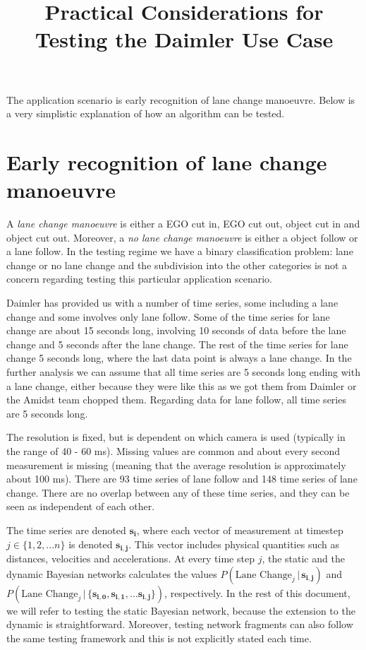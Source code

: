 \documentclass{article}
\title{Practical Considerations for Testing the Daimler Use Case}
\date{}
\theoremstyle{theorem}
\theoremstyle{definition}
\newcommand{\bu}[1]{\mathbf{#1}}
\newcommand{\bv}[1]{\bm{#1}}
\begin{document}
\maketitle

The application scenario is early recognition of lane change manoeuvre.  Below is a very simplistic explanation of how an algorithm can be tested. 

\section{Early recognition of lane change manoeuvre}

A \emph{lane change manoeuvre} is either a EGO cut in, EGO cut out, object cut in and object cut out. Moreover, a \emph{no lane change manoeuvre} is either a object follow or a lane follow.  In the testing regime we have a binary classification problem: lane change or no lane change and the subdivision into the other categories is not a concern regarding testing this particular application scenario.

Daimler has provided us with a number of time series, some including a lane change and some involves only lane follow. Some of the time series for lane change are about 15 seconds long, involving 10 seconds of data before the lane change and 5 seconds after the lane change. The rest of the time series for lane change 5 seconds long, where the last data point is always a lane change. In the further analysis we can assume that all time series are 5 seconds long ending with a lane change, either because they were like this as we got them from Daimler or the Amidst team chopped them. Regarding data  for lane follow, all time series are 5 seconds long.

The resolution is fixed, but is dependent on which camera is used (typically in the range of 40 - 60 ms).  Missing values are common and about every second measurement is missing (meaning that the average resolution is approximately about 100 ms).  There are 93 time series of lane follow and 148 time series of lane change.  There are no overlap between any of these time series, and they can be seen as independent of each other.

The time series are denoted $\bu{s_i}$, where each vector of measurement at timestep $j \in \{1,2, ... n\}$ is denoted $\bv{s_{i,j}}$. This vector includes physical quantities such as distances, velocities and accelerations.  At every time step $j$, the static and the dynamic Bayesian networks calculates the values  $P(\mbox{Lane Change}_j \,|\,  \bv{s_{i,j}})$ and \\
$P(\mbox{Lane Change}_j \,|\, \{ \bv{s_{i,0}}, \bv{s_{i,1}}, ... \bv{s_{i,j}} \})$, respectively.  In the rest of this document, we will refer to testing the static Bayesian network, because the extension to the dynamic is straightforward.  Moreover, testing network fragments can also follow the same testing framework and this is not explicitly stated each time.
\end{document}
